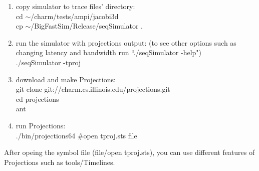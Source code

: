 \begin{enumerate}
\item copy simulator to trace files' directory:\\
        cd $\sim$/charm/tests/ampi/jacobi3d\\
        cp $\sim$/BigFastSim/Release/seqSimulator .\\

\item run the simulator with projections output: (to see other options such as changing latency and bandwidth run ``./seqSimulator -help")\\
        ./seqSimulator -tproj\\

\item download and make Projections:\\
        git clone git://charm.cs.illinois.edu/projections.git\\
        cd projections\\
        ant\\

\item run Projections:\\
        ./bin/projections64 \#open tproj.sts file\\

\end{enumerate}

After opeing the symbol file (file/open tproj.sts), you can use different features of Projections such as tools/Timelines.
